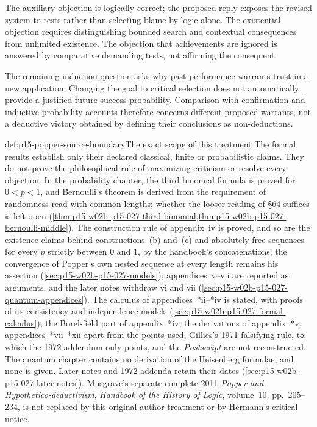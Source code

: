 The auxiliary objection is logically correct; the proposed reply
exposes the revised system to tests rather than selecting blame
by logic alone. The existential objection requires distinguishing
bounded search and contextual consequences from unlimited existence.
The objection that achievements are ignored is answered by comparative
demanding tests, not affirming the consequent.

The remaining induction question asks why past performance warrants
trust in a new application. Changing the goal to critical selection
does not automatically provide a justified future-success probability.
Comparison with confirmation and inductive-probability accounts
therefore concerns different proposed warrants, not a deductive
victory obtained by defining their conclusions as non-deductions.

\begin{proofboundary}{def:p15-popper-source-boundary}{The exact scope of this treatment}
The formal results establish only their declared classical, finite
or probabilistic claims. They do not prove the philosophical rule of
maximizing criticism or resolve every objection. In the probability
chapter, the third binomial formula is proved for \(0<p<1\), and
Bernoulli's theorem is derived from the requirement of randomness read
with common lengths; whether the looser reading of \S64 suffices is
left open (\cref{thm:p15-w02b-p15-027-third-binomial,thm:p15-w02b-p15-027-bernoulli-middle}).
The construction rule of appendix~iv is proved, and so are the
existence claims behind constructions~(b) and~(c) and absolutely free
sequences for every \(p\) strictly between \(0\) and \(1\), by the
handbook's concatenations; the convergence of Popper's own nested
sequence at every length remains his assertion
(\cref{sec:p15-w02b-p15-027-models}); appendices~v--vii are reported as
arguments, and the later notes withdraw vi and vii
(\cref{sec:p15-w02b-p15-027-quantum-appendices}). The calculus of
appendices~*ii--*iv is stated, with proofs of its consistency and
independence models (\cref{sec:p15-w02b-p15-027-formal-calculus}); the
Borel-field part of appendix~*iv, the derivations of appendix~*v,
appendices~*vii--*xii apart from the points used,
Gillies's 1971 falsifying rule, to which the 1972 addendum only points,
and the \emph{Postscript} are not reconstructed.
The quantum chapter contains no derivation of the Heisenberg formulae,
and none is given. Later notes and 1972 addenda retain their dates
(\cref{sec:p15-w02b-p15-027-later-notes}).
Musgrave's separate complete 2011 \emph{Popper and
Hypothetico-deductivism}, \emph{Handbook of the History of Logic},
volume~10, pp.~205--234, is not replaced by this original-author
treatment or by Hermann's critical notice.
\end{proofboundary}

